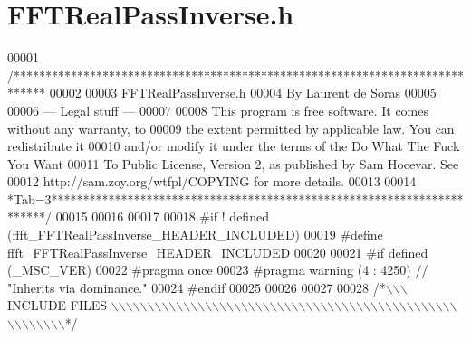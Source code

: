 \hypertarget{a00102_source}{\section{F\+F\+T\+Real\+Pass\+Inverse.\+h}
\label{a00102_source}
}

\begin{DoxyCode}
00001 \textcolor{comment}{/*****************************************************************************}
00002 \textcolor{comment}{}
00003 \textcolor{comment}{        FFTRealPassInverse.h}
00004 \textcolor{comment}{        By Laurent de Soras}
00005 \textcolor{comment}{}
00006 \textcolor{comment}{--- Legal stuff ---}
00007 \textcolor{comment}{}
00008 \textcolor{comment}{This program is free software. It comes without any warranty, to}
00009 \textcolor{comment}{the extent permitted by applicable law. You can redistribute it}
00010 \textcolor{comment}{and/or modify it under the terms of the Do What The Fuck You Want}
00011 \textcolor{comment}{To Public License, Version 2, as published by Sam Hocevar. See}
00012 \textcolor{comment}{http://sam.zoy.org/wtfpl/COPYING for more details.}
00013 \textcolor{comment}{}
00014 \textcolor{comment}{*Tab=3***********************************************************************/}
00015 
00016 
00017 
00018 \textcolor{preprocessor}{#if ! defined (ffft\_FFTRealPassInverse\_HEADER\_INCLUDED)}
00019 \textcolor{preprocessor}{#define ffft\_FFTRealPassInverse\_HEADER\_INCLUDED}
00020 
00021 \textcolor{preprocessor}{#if defined (\_MSC\_VER)}
00022 \textcolor{preprocessor}{    #pragma once}
00023 \textcolor{preprocessor}{    #pragma warning (4 : 4250) // "Inherits via dominance."}
00024 \textcolor{preprocessor}{#endif}
00025 
00026 
00027 
00028 \textcolor{comment}{/*\(\backslash\)\(\backslash\)\(\backslash\) INCLUDE FILES \(\backslash\)\(\backslash\)\(\backslash\)\(\backslash\)\(\backslash\)\(\backslash\)\(\backslash\)\(\backslash\)\(\backslash\)\(\backslash\)\(\backslash\)\(\backslash\)\(\backslash\)\(\backslash\)\(\backslash\)\(\backslash\)\(\backslash\)\(\backslash\)\(\backslash\)\(\backslash\)\(\backslash\)\(\backslash\)\(\backslash\)\(\backslash\)\(\backslash\)\(\backslash\)\(\backslash\)\(\backslash\)\(\backslash\)\(\backslash\)\(\backslash\)\(\backslash\)\(\backslash\)\(\backslash\)\(\backslash\)\(\backslash\)\(\backslash\)\(\backslash\)\(\backslash\)\(\backslash\)\(\backslash\)\(\backslash\)\(\backslash\)\(\backslash\)\(\backslash\)\(\backslash\)\(\backslash\)\(\backslash\)\(\backslash\)\(\backslash\)\(\backslash\)\(\backslash\)\(\backslash\)\(\backslash\)\(\backslash\)\(\backslash\)*/}

\end{DoxyCode}
